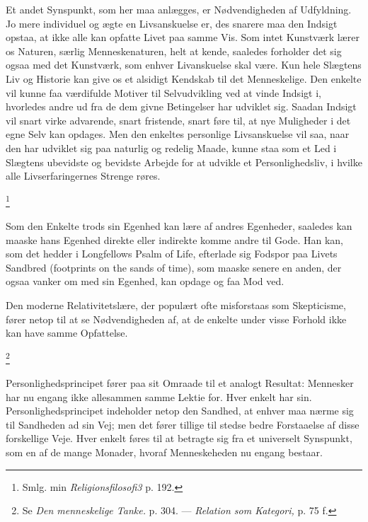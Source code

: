 \documentclass[12pt]{article}
\newcommand{\apage}[1]{\marginnote{\footnotesize\textit{[#1]}}}
\begin{document}
Et andet Synspunkt, som her maa anlægges, er Nødvendigheden af Udfyldning. Jo
mere individuel og ægte en Livsanskuelse er, des snarere maa den Indsigt
opstaa, at ikke alle kan opfatte Livet paa samme Vis. Som intet Kunstværk lærer
os Naturen, særlig Menneskenaturen, helt at kende, saaledes forholder det sig
ogsaa med det Kunstværk, som enhver Livanskuelse skal være. Kun hele Slægtens
Liv og Historie kan give os et alsidigt Kendskab til det Menneskelige. Den
enkelte vil kunne faa værdifulde Motiver til Selvudvikling ved at vinde Indsigt
i, hvorledes andre ud fra de dem givne Betingelser har udviklet sig. Saadan
Indsigt vil snart virke advarende, snart fristende, snart føre til, at nye
Muligheder i det egne Selv kan opdages. Men den enkeltes personlige
Livsanskuelse vil saa, naar den
\setcounter{footnote}{0}%
\apage{71}har udviklet sig paa naturlig og redelig Maade, kunne staa som et Led
i Slægtens ubevidste og bevidste Arbejde for at udvikle et Personlighedsliv, i
hvilke alle Livserfaringernes Strenge røres.

         \footnote{Smlg. min\textit{ Religionsfilosofi3 }p. 192.}

       Som den Enkelte trods sin Egenhed kan lære af andres Egenheder, saaledes
kan maaske hans Egenhed direkte eller indirekte komme andre til Gode. Han kan,
som det hedder i Longfellows \guillemotright{}Psalm of Life\guillemotleft{},
efterlade sig Fodspor paa Livets Sandbred (footprints on the sands of time),
som maaske senere en anden, der ogsaa vanker om med sin Egenhed, kan opdage og
faa Mod ved.

Den moderne Relativitetslære, der populært ofte misforstaas som Skepticisme,
fører netop til at se Nødvendigheden af, at de enkelte under visse Forhold ikke
kan have samme Opfattelse.

         \footnote{Se \textit{Den menneskelige Tanke.} p. 304. ---
\textit{Relation som Kategori, }p. 75 f.}

       Personlighedsprincipet fører paa sit Omraade til et analogt Resultat:
Mennesker har nu engang ikke allesammen samme Lektie for. Hver enkelt har sin.
Personlighedsprincipet indeholder netop den Sandhed, at enhver maa nærme sig
til Sandheden ad sin Vej; men det fører tillige til stedse bedre Forstaaelse af
disse forskellige Veje. Hver enkelt føres til at betragte sig fra et universelt
Synspunkt, som en af de mange \guillemotright{}Monader\guillemotleft{}, hvoraf
Menneskeheden nu engang bestaar.
\end{document}
